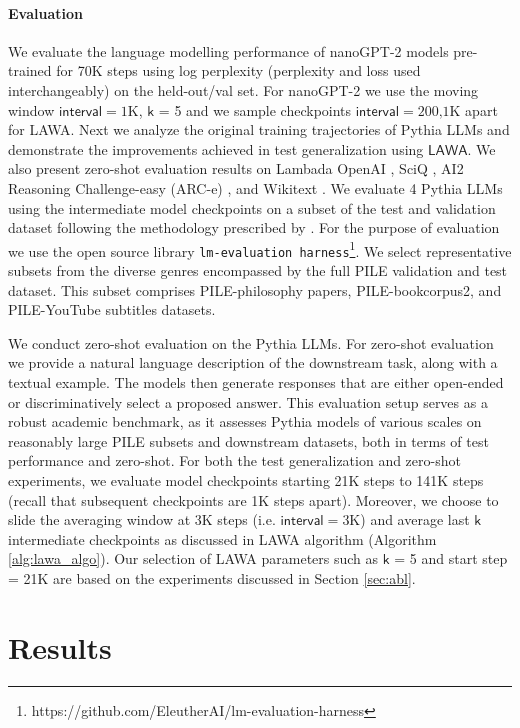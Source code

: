 \documentclass{article}
\newcommand{\method}{LAWA}
\begin{document}
\paragraph{Evaluation} We evaluate the language modelling performance of nanoGPT-2 models pre-trained for 70K steps using log perplexity (perplexity and loss used interchangeably) on the held-out/val set. For nanoGPT-2 we use the moving window $\mathsf{interval}=\text{1K}$, $\mathsf{k}$ = 5 and we sample checkpoints $\mathsf{interval}=\text{200,1K}$ apart for \method{}. Next we analyze the original training trajectories of Pythia LLMs and demonstrate the improvements achieved in test generalization using $\mathsf{LAWA}$. We also present zero-shot evaluation results on Lambada OpenAI \citep{paperno2016lambada}, SciQ \citep{sciq}, AI2 Reasoning Challenge-easy (ARC-e) \citep{Clark2018ThinkYH}, and Wikitext \citep{wikitext}. We evaluate 4 Pythia LLMs using the intermediate model checkpoints on a subset of the test and validation dataset following the methodology prescribed by \cite{xia2022training}. For the purpose of evaluation we use the open source library \texttt{lm-evaluation harness}\footnote{https://github.com/EleutherAI/lm-evaluation-harness}. We select representative subsets from the diverse genres encompassed by the full PILE validation and test dataset. This subset comprises PILE-philosophy papers, PILE-bookcorpus2, and PILE-YouTube subtitles datasets.

We conduct zero-shot evaluation on the Pythia LLMs. For zero-shot evaluation we provide a natural language description of the downstream task, along with a textual example. The models then generate responses that are either open-ended or discriminatively select a proposed answer. This evaluation setup serves as a robust academic benchmark, as it assesses Pythia models of various scales on reasonably large PILE subsets and downstream datasets, both in terms of test performance and zero-shot. For both the test generalization and zero-shot experiments, we evaluate model checkpoints starting 21K steps to 141K steps (recall that subsequent checkpoints are 1K steps apart). Moreover, we choose to slide the averaging window at 3K steps (i.e. $\mathsf{interval}=\text{3K}$) and average last $\mathsf{k}$ intermediate checkpoints as discussed in \method{} algorithm (Algorithm \ref{alg:lawa_algo}). Our selection of \method{} parameters such as $\mathsf{k}$ = 5 and start step = 21K are based on the experiments discussed in 
Section \ref{sec:abl}. 

\section{Results} \label{sec:results}
\end{document}
